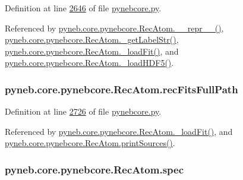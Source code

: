 Definition at line \hyperlink{pynebcore_8py_source_l02646}{2646} of file \hyperlink{pynebcore_8py_source}{pynebcore.\-py}.



Referenced by \hyperlink{pynebcore_8py_source_l03154}{pyneb.\-core.\-pynebcore.\-Rec\-Atom.\-\_\-\-\_\-repr\-\_\-\-\_\-()}, \hyperlink{pynebcore_8py_source_l02970}{pyneb.\-core.\-pynebcore.\-Rec\-Atom.\-\_\-get\-Label\-Str()}, \hyperlink{pynebcore_8py_source_l02754}{pyneb.\-core.\-pynebcore.\-Rec\-Atom.\-\_\-load\-Fit()}, and \hyperlink{pynebcore_8py_source_l02714}{pyneb.\-core.\-pynebcore.\-Rec\-Atom.\-\_\-load\-H\-D\-F5()}.

\hypertarget{classpyneb_1_1core_1_1pynebcore_1_1_rec_atom_af74fe68ebe037be119ac2f136485782b}{
\subsubsection[{rec\-Fits\-Full\-Path}]{\setlength{\rightskip}{0pt plus 5cm}pyneb.\-core.\-pynebcore.\-Rec\-Atom.\-rec\-Fits\-Full\-Path}}\label{classpyneb_1_1core_1_1pynebcore_1_1_rec_atom_af74fe68ebe037be119ac2f136485782b}


Definition at line \hyperlink{pynebcore_8py_source_l02726}{2726} of file \hyperlink{pynebcore_8py_source}{pynebcore.\-py}.



Referenced by \hyperlink{pynebcore_8py_source_l02754}{pyneb.\-core.\-pynebcore.\-Rec\-Atom.\-\_\-load\-Fit()}, and \hyperlink{pynebcore_8py_source_l02912}{pyneb.\-core.\-pynebcore.\-Rec\-Atom.\-print\-Sources()}.

\hypertarget{classpyneb_1_1core_1_1pynebcore_1_1_rec_atom_ac2485287f7694915959ba49b9b82e483}{
\subsubsection[{spec}]{\setlength{\rightskip}{0pt plus 5cm}pyneb.\-core.\-pynebcore.\-Rec\-Atom.\-spec}}\label{classpyneb_1_1core_1_1pynebcore_1_1_rec_atom_ac2485287f7694915959ba49b9b82e483}


